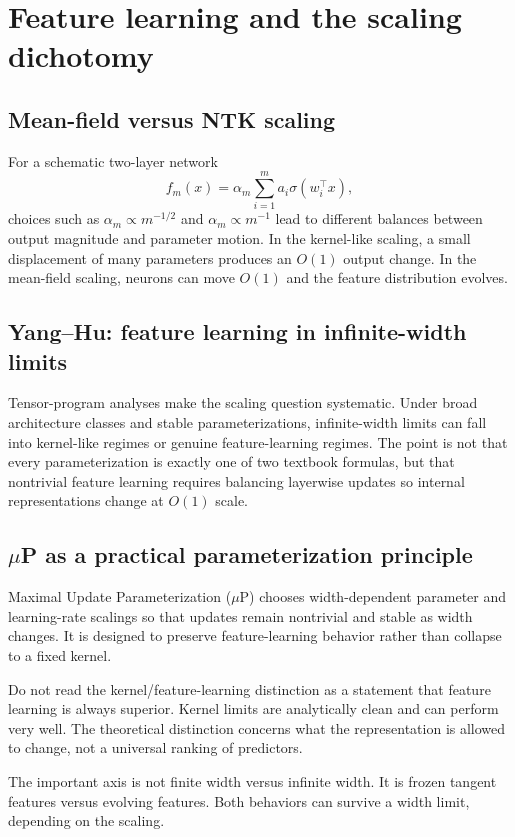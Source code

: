 \documentclass[11pt,a4paper,oneside,openany]{memoir}
\theoremstyle{definition}
\begin{document}
\chapter{Feature learning and the scaling dichotomy}
\section{Mean-field versus NTK scaling}
For a schematic two-layer network
\[
f_m(x)=\alpha_m\sum_{i=1}^m a_i\sigma(w_i^\top x),
\]
choices such as $\alpha_m\propto m^{-1/2}$ and $\alpha_m\propto m^{-1}$ lead to different balances between output magnitude and parameter motion.  In the kernel-like scaling, a small displacement of many parameters produces an $O(1)$ output change.  In the mean-field scaling, neurons can move $O(1)$ and the feature distribution evolves.

\section{Yang--Hu: feature learning in infinite-width limits}
Tensor-program analyses make the scaling question systematic.  Under broad architecture classes and stable parameterizations, infinite-width limits can fall into kernel-like regimes or genuine feature-learning regimes.  The point is not that every parameterization is exactly one of two textbook formulas, but that nontrivial feature learning requires balancing layerwise updates so internal representations change at $O(1)$ scale.

\section{$\mu$P as a practical parameterization principle}
Maximal Update Parameterization ($\mu$P) chooses width-dependent parameter and learning-rate scalings so that updates remain nontrivial and stable as width changes.  It is designed to preserve feature-learning behavior rather than collapse to a fixed kernel.

\begin{warningbox}
Do not read the kernel/feature-learning distinction as a statement that feature learning is always superior.  Kernel limits are analytically clean and can perform very well.  The theoretical distinction concerns what the representation is allowed to change, not a universal ranking of predictors.
\end{warningbox}

\begin{presentbox}
The important axis is not finite width versus infinite width.  It is frozen tangent features versus evolving features.  Both behaviors can survive a width limit, depending on the scaling.
\end{presentbox}
\end{document}
